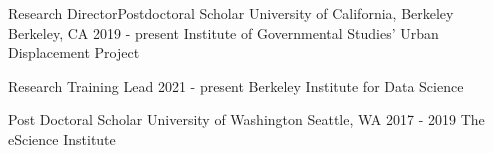 

\begin{cventries}



  \cventry
    {Research Director{\enskip\cdotp\enskip}Postdoctoral Scholar} %
    {University of California, Berkeley} %
    {Berkeley, CA} %
    {2019 - present} %
    {Institute of Governmental Studies' Urban Displacement Project}
    
  \cventry
    {Research Training Lead} %
    {} %
    {} %
    {2021 - present} %
    {Berkeley Institute for Data Science\newline}

  \cventry
    {Post Doctoral Scholar} %
    {University of Washington} %
    {Seattle, WA} %
    {2017 - 2019} %
    {The eScience Institute}

\end{cventries}